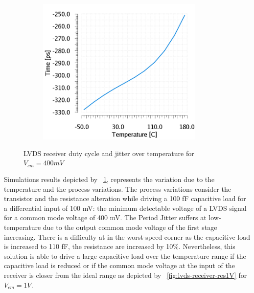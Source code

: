 \begin{figure}[htp]
\begin{subfigure}[b]{0.32\textwidth}
        \includegraphics[width=0.9\textwidth]{Chapter5/Figs/lvds/ErrorClockPeriod.png}
    \end{subfigure}
    \caption{LVDS receiver duty cycle and jitter over temperature for $V_{cm} = 400 mV$}
    \label{fig:lvds-receiver-res}
\end{figure}

Simulations results depicted by \figurename~\ref{fig:lvds-receiver-res}, represents the variation due to the temperature and the process variations. The process variations consider the transistor and the resistance alteration while driving a 100 fF capacitive load for a differential input of 100 mV: the minimum detectable voltage of a LVDS signal for a common mode voltage of 400 mV. The Period Jitter suffers at low-temperature due to the output common mode voltage of the first stage increasing. There is a difficulty at in the worst-speed corner as the capacitive load is increased to 110 fF, the resistance are increased by 10\%. Nevertheless, this solution is able to drive a large capacitive load over the temperature range if the capacitive load is reduced or if the common mode voltage at the input of the receiver is closer from the ideal range as depicted by \figurename~\ref{fig:lvds-receiver-res1V} for $V_{cm} = 1 V$.


